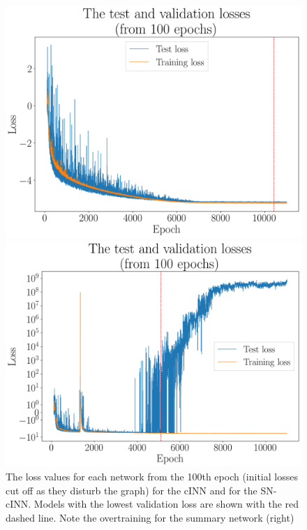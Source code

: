 \begin{figure}[h!]
	\begin{minipage}{.5\textwidth}
		\centering
		\includegraphics[width=\linewidth]{figures/inference/losses}
	\end{minipage}%
	\begin{minipage}{.5\textwidth}
		\centering
		\includegraphics[width=\linewidth]{figures/inference/losses_SN}
	\end{minipage}
	\centering
	\caption{The loss values for each network from the 100th epoch (initial losses cut off as they disturb the graph) for the cINN and for the SN-cINN. Models with the lowest validation loss are shown with the red dashed line. Note the overtraining for the summary network (right)}
	\label{fig:losses}
\end{figure}

